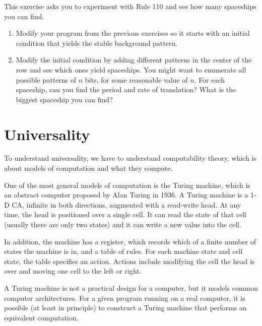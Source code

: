 \documentclass[10pt]{book}
\begin{document}
\begin{exercise}

This exercise asks you to experiment with Rule 110 and see how
many spaceships you can find.

\begin{enumerate}

\item Modify your program from the previous exercises so it starts
  with an initial condition that yields the stable background
  pattern.

\item Modify the initial condition by adding different patterns in the
  center of the row and see which ones yield spaceships.  You might
  want to enumerate all possible patterns of $n$ bits, for some
  reasonable value of $n$.  For each spaceship, can you find the
  period and rate of translation?  What is the biggest spaceship you
  can find?

\end{enumerate}

\end{exercise}


\section{Universality}

To understand universality, we have to understand computability
theory, which is about models of computation and what they compute.

One of the most general models of computation is the Turing machine,
which is an abstract computer proposed by Alan Turing in 1936.  A
Turing machine is a 1-D CA, infinite in both directions, augmented
with a read-write head.  At any time, the head is positioned over a
single cell.  It can read the state of that cell (usually there are
only two states) and it can write a new value into the cell.

In addition, the machine has a register, which records which
of a finite number of states the machine is in, and a table
of rules.  For each machine state and cell state, the table
specifies an action.  Actions include modifying the cell
the head is over and moving one cell to the left or right.

A Turing machine is not a practical design for a computer, but it
models common computer architectures.  For a given program running on
a real computer, it is possible (at least in principle) to construct a
Turing machine that performs an equivalent computation.
\end{document}
